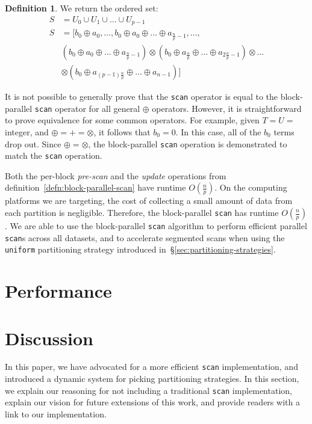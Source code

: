 \documentclass[preprint]{sigplanconf}
\theoremstyle{definition}
\newtheorem{defn}{Definition}
\begin{document}
\begin{defn}
We return the ordered set:
\begin{equation*}
\begin{split}
S &=U_0 \cup U_1 \cup \ldots \cup U_{p - 1} \\
S &= [b_0 \oplus a_0, \ldots, b_0 \oplus a_0 \oplus \ldots \oplus a_{\frac{n}{p} - 1}, \ldots, \\
 &(b_0 \oplus
a_0 \oplus \ldots \oplus a_{\frac{n}{p} - 1}) \otimes (b_0 \oplus a_{\frac{n}{p}} \oplus \ldots \oplus
a_{2\frac{n}{p} - 1}) \otimes \ldots \\
& \otimes (b_0 \oplus a_{(p - 1)\frac{n}{p}} \oplus \ldots \oplus a_{n - 1})]
\end{split}
\end{equation*}
\end{defn}

It is not possible to generally prove that the \texttt{scan} operator is equal to the block-parallel
\texttt{scan} operator for all general $\oplus$ operators. However, it is straightforward to prove
equivalence for some common operators. For example, given $T = U =$ integer, and $\oplus = +
= \otimes$, it follows that $b_0 = 0$. In this case, all of the $b_0$ terms drop out. Since $\oplus =
\otimes$, the block-parallel \texttt{scan} operation is demonstrated to match the \texttt{scan} operation.

Both the per-block \emph{pre-scan} and the \emph{update} operations from
definition~\ref{defn:block-parallel-scan} have runtime $O(\frac{n}{p})$. On the computing platforms we
are targeting, the cost of collecting a small amount of data from each partition is negligible. Therefore,
the block-parallel \texttt{scan} has runtime $O(\frac{n}{p})$. We are able to use the block-parallel
\texttt{scan} algorithm to perform efficient parallel \texttt{scan}s across all datasets, and to accelerate
segmented scans when using the \texttt{uniform} partitioning strategy introduced
in~\S\ref{sec:partitioning-strategies}.

\section{Performance}
\label{sec:performance}

\section{Discussion}
\label{sec:discussion}

In this paper, we have advocated for a more efficient \texttt{scan} implementation, and introduced
a dynamic system for picking partitioning strategies. In this section, we explain our reasoning for not
including a traditional \texttt{scan} implementation, explain our vision for future extensions of this work,
and provide readers with a link to our implementation.
\end{document}
